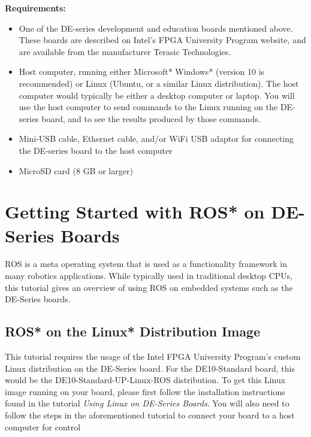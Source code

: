 \documentclass[11pt, twoside, pdftex]{article}
\begin{document}
{\bf Requirements:}
\begin{itemize}
\item One of the DE-series development and education boards mentioned above. These boards are 
described on Intel's FPGA University Program website, and are available from the manufacturer 
Terasic Technologies.

\item Host computer, running either Microsoft* Windows* (version 10 is recommended) or Linux 
(Ubuntu, or a similar Linux distribution). The host computer would typically be either a
desktop computer or laptop. You will use the host computer to send commands to the Linux
running on the DE-series board, and to see the results produced by those commands.

\item Mini-USB cable, Ethernet cable, and/or WiFi USB adaptor for connecting the DE-series board
to the host computer 

\item MicroSD card (8 GB or larger)
\end{itemize}

\section{Getting Started with ROS* on DE-Series Boards}
                   
ROS is a meta operating system that is used as a functionality framework in many robotics applications. While typically used in traditional desktop CPUs, this tutorial gives an overview of using ROS on embedded systems such as the DE-Series boards.


\subsection{ROS* on the Linux* Distribution Image}

This tutorial requires the usage of the Intel FPGA University Program's custom Linux distribution on the DE-Series board. For the DE10-Standard board, this would be the DE10-Standard-UP-Linux-ROS distribution. To get this Linux image running on your board, please first follow the installation instructions found in the tutorial {\it Using Linux on DE-Series Boards}. You will also need to follow the steps in the aforementioned tutorial to connect your board to a host computer for control
\end{document}
